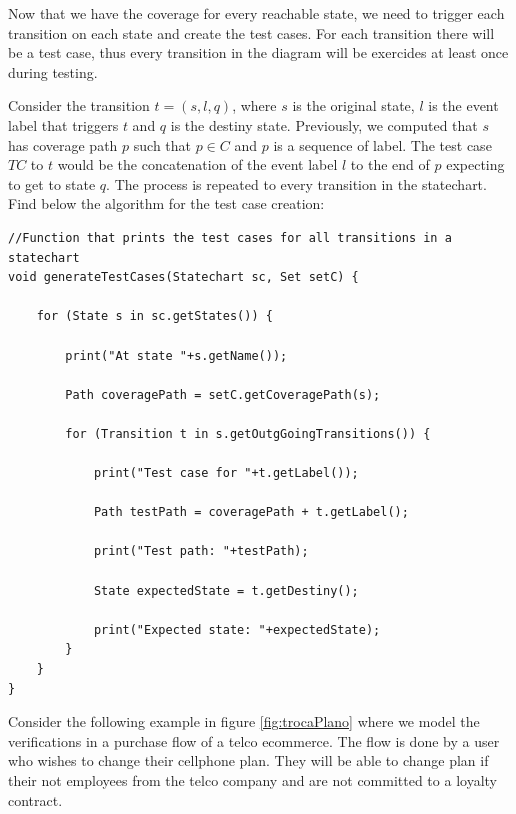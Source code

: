 Now that we have the coverage for every reachable state, we need to trigger each transition on each state and create the test cases. For each transition there will be a test case, thus every transition in the diagram will be exercides at least once during testing.

Consider the transition $t = (s,l,q)$, where $s$ is the original state, $l$ is the event label that triggers $t$ and $q$ is the destiny state. Previously, we computed that $s$ has coverage path $p$ such that $p \in C$ and $p$ is a sequence of label. The test case $TC$ to $t$ would be the concatenation of the event label $l$ to the end of $p$ expecting to get to state $q$. The process is repeated to every transition in the statechart. Find below the algorithm for the test case creation:

\begin{lstlisting}[label={pseudocodeTestCase}]
//Function that prints the test cases for all transitions in a statechart
void generateTestCases(Statechart sc, Set setC) {

	for (State s in sc.getStates()) {
	
		print("At state "+s.getName());

		Path coveragePath = setC.getCoveragePath(s);

		for (Transition t in s.getOutgGoingTransitions()) {

			print("Test case for "+t.getLabel());

			Path testPath = coveragePath + t.getLabel();

			print("Test path: "+testPath);

			State expectedState = t.getDestiny();

			print("Expected state: "+expectedState);
		}
	}
}
\end{lstlisting}


Consider the following example in figure \ref{fig:trocaPlano} where we model the verifications in a purchase flow of a telco ecommerce. The flow is done by a user who wishes to change their cellphone plan. They will be able to change plan if their not employees from the telco company and are not committed to a loyalty contract.

